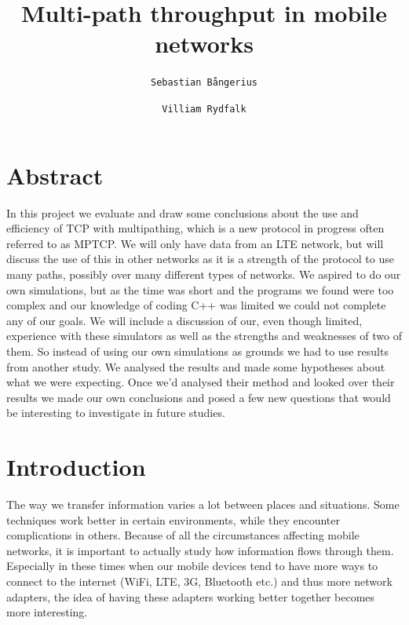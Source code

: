 \documentclass[11pt,twocolumn]{article}
\author{
  \texttt{Sebastian Bångerius}
  \and
  \texttt{Villiam Rydfalk}
}
\begin{document}

\title{Multi-path throughput in mobile networks}
\maketitle

\cleardoublepage


\section{Abstract}

In this project we evaluate and draw some conclusions about the use and efficiency of TCP with multipathing, which is a new protocol in progress often referred to as MPTCP. We will only have data from an LTE network, but will discuss the use of this in other networks as it is a strength of the protocol to use many paths, possibly over many different types of networks. We aspired to do our own simulations, but as the time was short and the programs we found  were too complex and our knowledge of coding C++ was limited we could not complete any of our goals. We will include a discussion of our, even though limited, experience with these simulators as well as the strengths and weaknesses of two of them. So instead of using our own simulations as grounds we had to use results from another study. \cite{MPTCP-LTE} We analysed the results and made some hypotheses about what we were expecting. Once we'd analysed their method and looked over their results we made our own conclusions and posed a few new questions that would be interesting to investigate in future studies.



\section{Introduction}

The way we transfer information varies a lot between places and situations. Some techniques work better in certain environments, while they encounter complications in others. Because of all the circumstances affecting mobile networks, it is important to actually study how information flows through them. Especially in these times when our mobile devices tend to have more ways to connect to the internet (WiFi, LTE, 3G, Bluetooth etc.) and thus more network adapters, the idea of having these adapters working better together becomes more interesting.
\end{document}
